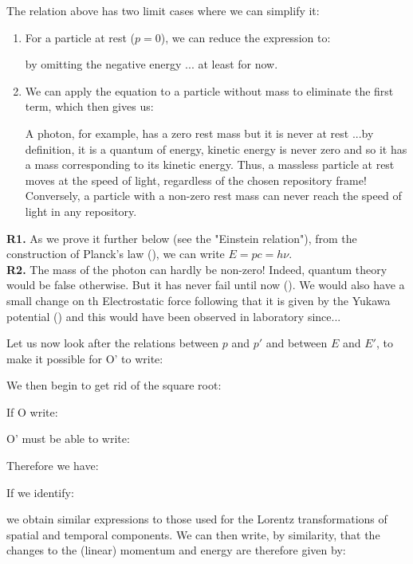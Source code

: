 	The relation above has two limit cases where we can simplify it:
	\begin{enumerate}
		\item For a particle at rest ($p = 0$), we can reduce the expression to:
		
		by omitting the negative energy ... at least for now.

		\item We can apply the equation to a particle without mass to eliminate the first term, which then gives us:
		
		A photon, for example, has a zero rest mass but it is never at rest ...by definition, it is a quantum of energy, kinetic energy is never zero and so it has a mass corresponding to its kinetic energy. Thus, a massless particle at rest moves at the speed of light, regardless of the chosen repository frame! Conversely, a particle with a non-zero rest mass can never reach the speed of light in any repository.
	\end{enumerate}
	\begin{tcolorbox}[title=Remarks,colframe=black,arc=10pt]
	\textbf{R1.} As we prove it further below (see the "Einstein relation"), from the construction of Planck's law (), we can write $E=pc=h\nu$.\\
	
	\textbf{R2.} The mass of the photon can hardly be non-zero! Indeed, quantum theory would be false otherwise. But it has never fail until now (). We would also have a small change on th Electrostatic force following that it is given by the Yukawa potential () and this would have been observed in laboratory since...
	\end{tcolorbox}
	Let us now look after the relations between $p$ and $p'$ and between $E$ and $E'$, to make it possible for O' to write:
	
	We then begin to get rid of the square root:
	
	If O write:
	
	O' must be able to write:
	
	Therefore we have:
	
	If we identify:
	
	we obtain similar expressions to those used for the Lorentz transformations of spatial and temporal components. We can then write, by similarity, that the changes to the (linear) momentum and energy are therefore given by:
	
